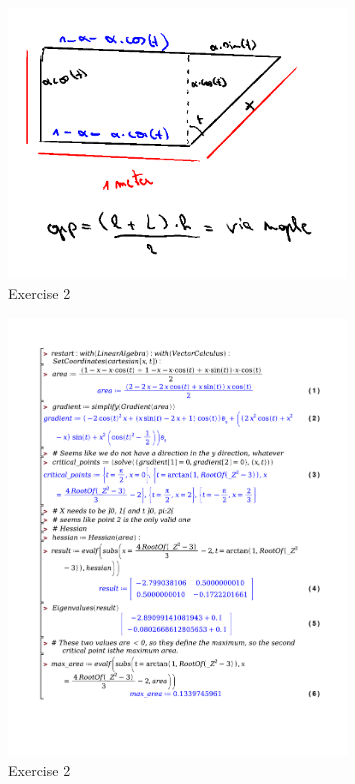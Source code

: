 \documentclass[a4paper]{report}
\begin{document}
\begin{figure}[H]
	\centering
	\includegraphics[width=0.8\textwidth]{assets/wc_4_ex_2.png}
	\caption{Exercise 2}
	\label{fig:wc_4_ex_2}
\end{figure}

\begin{figure}[H]
	\centering
	\includegraphics[width=0.8\textwidth]{exercises/wc_4_ex_2.pdf}
	\caption{Exercise 2}
	\label{fig:wc_4_ex_2_maple}
\end{figure}
\end{document}
